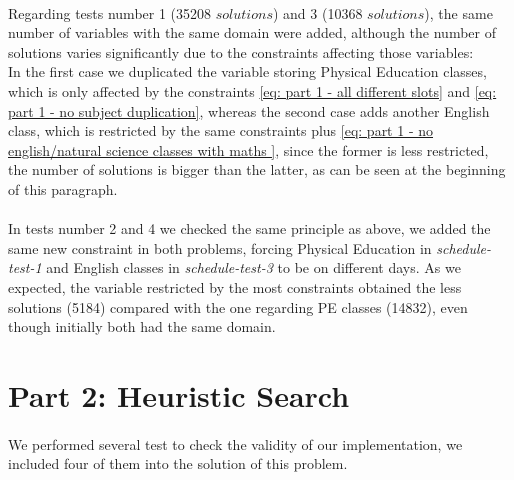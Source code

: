 \paragraph{}
Regarding tests number 1 (35208 $solutions$) and 3 (10368 $solutions$), the same number of variables with the same domain were added, although the number of solutions varies significantly due to the constraints affecting those variables:\\
In the first case we duplicated the variable storing Physical Education classes, which is only affected by the constraints \ref{eq: part 1 - all different slots} and \ref{eq: part 1 - no subject duplication}, whereas the second case adds another English class, which is restricted by the same constraints plus \ref{eq: part 1 - no english/natural science classes with maths }, since the former is less restricted, the number of solutions is bigger than the latter, as can be seen at the beginning of this paragraph.

\paragraph{}
In tests number 2 and 4 we checked the same principle as above, we added the same new constraint in both problems, forcing Physical Education in \textit{schedule-test-1} and English classes in \textit{schedule-test-3} to be on different days. As we expected, the variable restricted by the most constraints obtained the less solutions (5184) compared with the one regarding PE classes (14832), even though initially both had the same domain.

\section{Part 2: Heuristic Search}
\paragraph{}
We performed several test to check the validity of our implementation, we included four of them into the solution of this problem.


